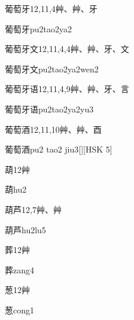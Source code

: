 \begin{entry}{葡萄牙}{12,11,4}{⾋、⾋、⽛}
  \begin{phonetics}{葡萄牙}{pu2tao2ya2}
  \end{phonetics}
\end{entry}

\begin{entry}{葡萄牙文}{12,11,4,4}{⾋、⾋、⽛、⽂}
  \begin{phonetics}{葡萄牙文}{pu2tao2ya2wen2}
  \end{phonetics}
\end{entry}

\begin{entry}{葡萄牙语}{12,11,4,9}{⾋、⾋、⽛、⾔}
  \begin{phonetics}{葡萄牙语}{pu2tao2ya2yu3}
  \end{phonetics}
\end{entry}

\begin{entry}{葡萄酒}{12,11,10}{⾋、⾋、⾣}
  \begin{phonetics}{葡萄酒}{pu2 tao2 jiu3}[][HSK 5]
  \end{phonetics}
\end{entry}

\begin{entry}{葫}{12}{⾋}
  \begin{phonetics}{葫}{hu2}
  \end{phonetics}
\end{entry}

\begin{entry}{葫芦}{12,7}{⾋、⾋}
  \begin{phonetics}{葫芦}{hu2lu5}
  \end{phonetics}
\end{entry}

\begin{entry}{葬}{12}{⾋}
  \begin{phonetics}{葬}{zang4}
  \end{phonetics}
\end{entry}

\begin{entry}{葱}{12}{⾋}
  \begin{phonetics}{葱}{cong1}
  \end{phonetics}
\end{entry}

